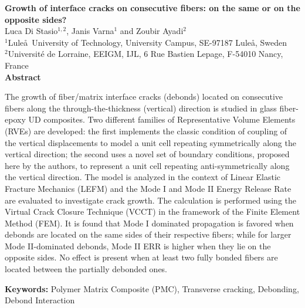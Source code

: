\thispagestyle{plain}
\begin{center}
\Large\textbf{Growth of interface cracks on consecutive fibers: on the same or on the opposite sides?}\\
\vspace{10mm}
\normalsize Luca Di Stasio$^{1,2}$, Janis Varna$^{1}$ and Zoubir Ayadi$^{2}$\\
\vspace{5mm}
\normalsize $^{1}$Lule\aa\ University of Technology, University Campus, SE-97187 Lule\aa, Sweden\\
\normalsize $^{2}$Universit\'e de Lorraine, EEIGM, IJL, 6 Rue Bastien Lepage, F-54010 Nancy, France\\
\vspace{15mm}
\textbf{Abstract}\\
\end{center}

The growth of fiber/matrix interface cracks (debonds) located on consecutive fibers along the through-the-thickness (vertical) direction is studied in glass fiber-epoxy UD composites. Two different families of Representative Volume Elements (RVEs) are developed: the first implements the classic condition of coupling of the vertical displacements to model a unit cell repeating symmetrically along the vertical direction; the second uses a novel set of boundary conditions, proposed here by the authors, to represent a unit cell repeating anti-symmetrically along the vertical direction. The model is analyzed in the context of Linear Elastic Fracture Mechanics (LEFM) and the Mode I and Mode II Energy Release Rate are evaluated to investigate crack growth. The calculation is performed using the Virtual Crack Closure Technique (VCCT) in the framework of the Finite Element Method (FEM). It is found that Mode I dominated propagation is favored when debonds are located on the same sides of their respective fibers; while for larger Mode II-dominated debonds, Mode II ERR is higher when they lie on the opposite sides. No effect is present when at least two fully bonded fibers are located between the partially debonded ones.

\vspace{5mm}

\textbf{Keywords:} Polymer Matrix Composite (PMC), Transverse cracking, Debonding, Debond Interaction



